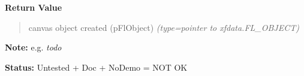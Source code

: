 \begin{boxedminipage}{\funcwidth}
\begin{quote}
      \end{quote}

      \textbf{Return Value}
    \vspace{-1ex}

      \begin{quote}

canvas object created (pFlObject)
      {\it (type=pointer to xfdata.FL\_OBJECT)}

      \end{quote}

\textbf{Note:} 
e.g. \emph{todo}


\textbf{Status:} 
Untested + Doc + NoDemo = NOT OK


    \end{boxedminipage}

    \label{xformslib:flcanvas:fl_add_canvas}

    \vspace{0.5ex}

